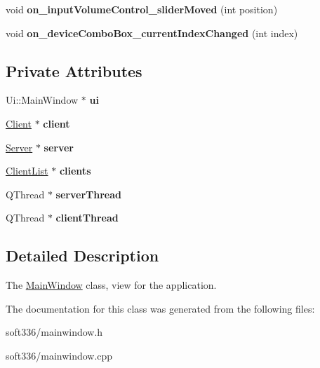 \begin{DoxyCompactItemize}
\item 
\hypertarget{class_main_window_a396f4f5f9647db90598dae948d56ef70}{void {\bfseries on\+\_\+input\+Volume\+Control\+\_\+slider\+Moved} (int position)}\label{class_main_window_a396f4f5f9647db90598dae948d56ef70}

\item 
\hypertarget{class_main_window_a9f27c5371f7dab39063a41706c5efa09}{void {\bfseries on\+\_\+device\+Combo\+Box\+\_\+current\+Index\+Changed} (int index)}\label{class_main_window_a9f27c5371f7dab39063a41706c5efa09}

\end{DoxyCompactItemize}
\subsection*{Private Attributes}
\begin{DoxyCompactItemize}
\item 
\hypertarget{class_main_window_a35466a70ed47252a0191168126a352a5}{Ui\+::\+Main\+Window $\ast$ {\bfseries ui}}\label{class_main_window_a35466a70ed47252a0191168126a352a5}

\item 
\hypertarget{class_main_window_a5ff30e3e49a45f2b768cff8287c8cee3}{\hyperlink{class_client}{Client} $\ast$ {\bfseries client}}\label{class_main_window_a5ff30e3e49a45f2b768cff8287c8cee3}

\item 
\hypertarget{class_main_window_aca501db88230221cadf592104aa37ee5}{\hyperlink{class_server}{Server} $\ast$ {\bfseries server}}\label{class_main_window_aca501db88230221cadf592104aa37ee5}

\item 
\hypertarget{class_main_window_a9037ac1b7578485d6733a5d9a93ea04e}{\hyperlink{class_client_list}{Client\+List} $\ast$ {\bfseries clients}}\label{class_main_window_a9037ac1b7578485d6733a5d9a93ea04e}

\item 
\hypertarget{class_main_window_a7b2bc2ba82b635e3fe38c16228089a69}{Q\+Thread $\ast$ {\bfseries server\+Thread}}\label{class_main_window_a7b2bc2ba82b635e3fe38c16228089a69}

\item 
\hypertarget{class_main_window_a91a3d3c80f2654854f8879fcfbc55f97}{Q\+Thread $\ast$ {\bfseries client\+Thread}}\label{class_main_window_a91a3d3c80f2654854f8879fcfbc55f97}

\end{DoxyCompactItemize}


\subsection{Detailed Description}
The \hyperlink{class_main_window}{Main\+Window} class, view for the application. 

The documentation for this class was generated from the following files\+:\begin{DoxyCompactItemize}
\item 
soft336/mainwindow.\+h\item 
soft336/mainwindow.\+cpp\end{DoxyCompactItemize}
